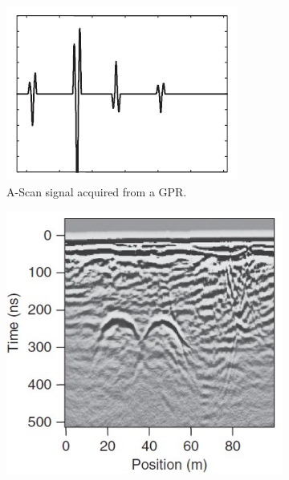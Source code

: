 \documentclass{article}
\begin{document}
\begin{figure}
    \centering
    \begin{subfigure}[b]{0.4\textwidth}
        \centering
        \includegraphics[width=\textwidth]{images/A_Scan_sample.jpg}
        \caption{A-Scan signal acquired from a GPR.}
        \label{fig:gpr-a-scan}
    \end{subfigure}
    \hfill
    \begin{subfigure}[b]{0.4\textwidth}
        \centering
        \includegraphics[width=\textwidth]{images/B_Scan_sample.jpg}

\end{subfigure}
\end{figure}
\end{document}
